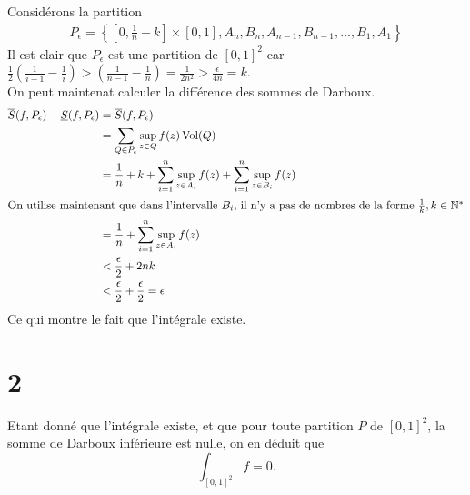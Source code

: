 \documentclass[11pt, a4paper]{article}
\begin{document}
Considérons la partition 
\begin{align*}
	P_\epsilon = \left\{ [ 0, \frac{1}{n}-k] \times [ 0,1] ,A_n ,B_n, A_{n-1} ,B_{n-1} , \ldots, B_1, A_1  \right\} 
\end{align*}
Il est clair que $P_\epsilon$ est une partition de $ [ 0,1] ^{2}$ car $ \frac{1}{2} ( \frac{1}{i-1} - \frac{1}{i} ) > ( \frac{1}{n-1} - \frac{1}{n}  )= \frac{1}{2n^{2}} > \frac{\epsilon}{4n} =k $.\\
On peut maintenat calculer la différence des sommes de Darboux.
\begin{align*}
	\overline{S}( f, P_\epsilon) - \underline{S}( f, P_\epsilon) &= \overline{S}( f, P_\epsilon)\\
								     &= \sum_{Q \in P_\epsilon} \sup_{z \in Q} f( z)  \operatorname*{Vol}  ( Q) \\
								     &= \frac{1}{n} + k + \sum_{i=1}^{ n} \sup_{z \in A_i}  f( z) + \sum_{i=1}^{ n}\sup_{z \in B_i} f( z)  \\
								     \intertext{On utilise maintenant que dans l'intervalle $B_i$, il n'y a pas de nombres de la forme $ \frac{1}{k}, k \in \mathbb{N}^{*}$}
								     &= \frac{1}{n}+ \sum_{i=1}^{ n} \sup_{z \in A_i}  f( z) \\
				     & <  \frac{\epsilon}{2} +  2n k\\
				     & < \frac{\epsilon}{2} + \frac{\epsilon}{2}  = \epsilon
\end{align*}
Ce qui montre le fait que l'intégrale existe.
\section*{2}
Etant donné que l'intégrale existe, et que pour toute partition $P$ de $[0,1]^{2}$, la somme de Darboux inférieure est nulle, on en déduit que 
\[ 
	\int_{[0,1]^{2}} f = 0.
\]
\end{document}
